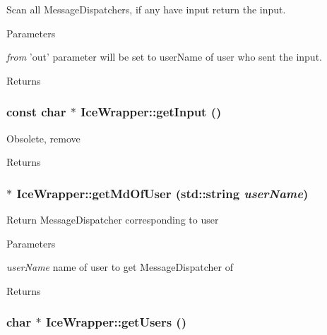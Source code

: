 \label{classIceWrapper_a6e73ef401f985702be9d97abdbb1eb06}
Scan all MessageDispatchers, if any have input return the input. 
\begin{DoxyParams}{Parameters}
\item[{\em from}]'out' parameter will be set to userName of user who sent the input. \end{DoxyParams}
\begin{DoxyReturn}{Returns}

\end{DoxyReturn}
\hypertarget{classIceWrapper_a34441a1215d0eb306b2227a9881609bd}{
\subsubsection[{getInput}]{\setlength{\rightskip}{0pt plus 5cm}const char $\ast$ IceWrapper::getInput ()}}
\label{classIceWrapper_a34441a1215d0eb306b2227a9881609bd}
Obsolete, remove \begin{DoxyReturn}{Returns}

\end{DoxyReturn}
\hypertarget{classIceWrapper_a625864eb115efac6d31ea041f8093a77}{
\subsubsection[{getMdOfUser}]{ $\ast$ IceWrapper::getMdOfUser (std::string {\em userName})}}
\label{classIceWrapper_a625864eb115efac6d31ea041f8093a77}
Return MessageDispatcher corresponding to user 
\begin{DoxyParams}{Parameters}
\item[{\em userName}]name of user to get MessageDispatcher of \end{DoxyParams}
\begin{DoxyReturn}{Returns}

\end{DoxyReturn}
\hypertarget{classIceWrapper_a7c19df1031dcd86d2133c5a179bb7ece}{
\subsubsection[{getUsers}]{\setlength{\rightskip}{0pt plus 5cm}char $\ast$ IceWrapper::getUsers ()}}
